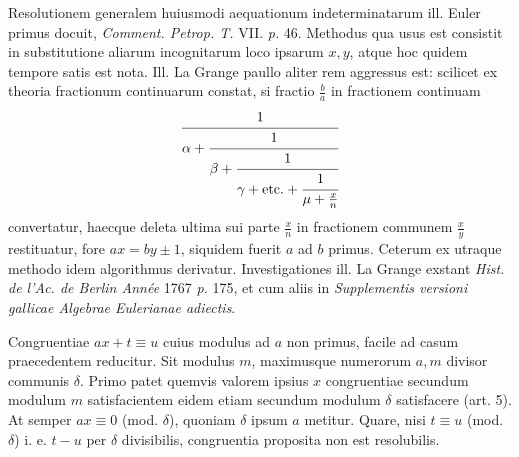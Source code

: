 
Resolutionem generalem huiusmodi aequationum indeterminatarum ill. Euler primus docuit,
\emph{Comment. Petrop. T.} VII. \emph{p.} 46. Methodus qua usus est consistit in substitutione
aliarum incognitarum loco ipsarum $x, y$, atque hoc quidem tempore satis est nota. Ill. La
Grange paullo aliter rem aggressus est: scilicet ex theoria fractionum continuarum constat,
si fractio $\frac{b}{a}$ in fractionem continuam
\[
\cfrac{1}{\alpha + \cfrac{1}{\beta + \cfrac{1}{\gamma + \text{etc.} + \cfrac{1}{\mu + \frac{x}{n}}}}}
\]
convertatur, haecque deleta ultima sui parte $\frac{x}{n}$ in fractionem communem
$\frac{x}{y}$ restituatur, fore $ax=by\pm1$, siquidem fuerit $a$ ad $b$ primus. Ceterum ex
utraque methodo idem algorithmus derivatur. Investigationes ill. La Grange exstant
\emph{Hist. de l'Ac. de Berlin Année} 1767 \emph{p.} 175, et cum aliis in \emph{Supplementis
versioni gallicae Algebrae Eulerianae adiectis}.


Congruentiae $ax+t \equiv u$ cuius modulus ad $a$ non primus, facile ad casum praecedentem
reducitur. Sit modulus $m$, maximusque numerorum $a, m$ divisor communis $\delta$. Primo
patet quemvis valorem ipsius $x$ congruentiae secundum modulum $m$ satisfacientem eidem
etiam secundum modulum $\delta$ satisfacere (art. 5). At semper $ax \equiv 0$ (mod.
$\delta$), quoniam $\delta$ ipsum $a$ metitur. Quare, nisi $t \equiv u$ (mod. $\delta$) i.
e. $t-u$ per $\delta$ divisibilis, congruentia proposita non est resolubilis.
